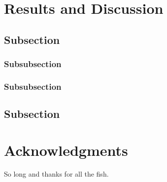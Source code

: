 \documentclass[fleqn,10pt,lineno]{wlpeerj} %
\begin{document}
\section*{Results and Discussion}

\lipsum[10] %

\subsection*{Subsection}

\lipsum[11] %

\subsubsection*{Subsubsection}

\lipsum[12] %

\subsubsection*{Subsubsection}

\lipsum[14] %

\subsection*{Subsection}

\lipsum[15-20] %

\section*{Acknowledgments}

So long and thanks for all the fish.


\end{document}
